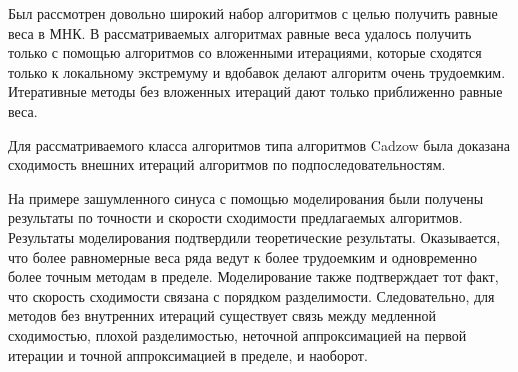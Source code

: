 \documentclass[12pt, specialist, subf,href,colorlinks=true,substylefile = spbu.rtx]{disser}
\theoremstyle{remark}
\theoremstyle{definition}
\begin{document}
Был рассмотрен довольно широкий набор алгоритмов с целью получить равные веса в МНК. В рассматриваемых алгоритмах равные веса удалось
получить только с помощью алгоритмов со вложенными итерациями, которые сходятся только к локальному экстремуму и вдобавок делают алгоритм очень трудоемким.
Итеративные методы без вложенных итераций дают только приближенно равные веса.

Для рассматриваемого класса алгоритмов типа алгоритмов Cadzow была доказана сходимость внешних итераций алгоритмов по подпоследовательностям.

На примере зашумленного синуса с помощью моделирования были получены результаты по точности и скорости сходимости предлагаемых алгоритмов. Результаты моделирования подтвердили теоретические результаты. Оказывается, что более равномерные веса ряда ведут  к более трудоемким и одновременно более точным методам в пределе. Моделирование также подтверждает тот факт, что скорость сходимости связана с порядком разделимости. Следовательно, для методов без внутренних итераций существует связь между медленной сходимостью, плохой разделимостью, неточной аппроксимацией на первой итерации и точной аппроксимацией в пределе, и наоборот.

\end{document}
